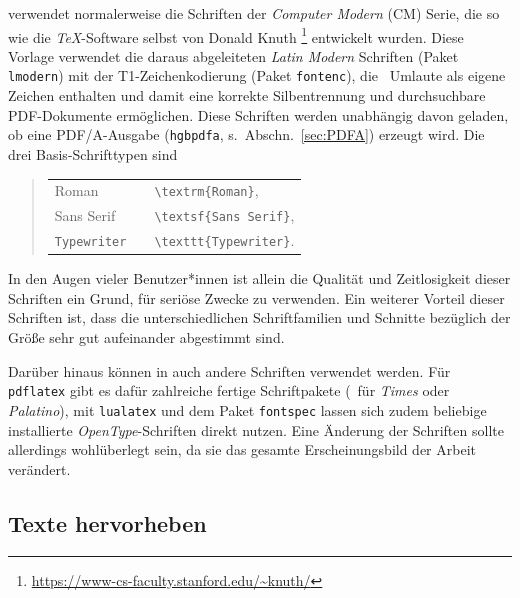 \latex verwendet normalerweise die Schriften der \emph{Computer Modern} (CM)
Serie, die so wie die \emph{TeX}-Software selbst von Donald Knuth%
\footnote{\url{https://www-cs-faculty.stanford.edu/~knuth/}}
entwickelt wurden. Diese Vorlage verwendet die daraus abgeleiteten
\emph{Latin Modern} Schriften (Paket \texttt{lmodern}) mit der
T1-Zeichenkodierung (Paket \texttt{fontenc}), die \ua\ Umlaute als eigene
Zeichen enthalten und damit eine korrekte Silbentrennung und durchsuchbare
PDF-Dokumente ermöglichen. Diese Schriften werden unabhängig davon geladen, ob
eine PDF/A-Ausgabe (\texttt{hgbpdfa}, s.\ Abschn.~\ref{sec:PDFA}) erzeugt wird.
Die drei Basis-Schrifttypen sind
%
\begin{quote}
    \begin{tabular}{lcl}
        \textrm{Roman}      & & \verb!\textrm{Roman}!,      \\
        \textsf{Sans Serif} & & \verb!\textsf{Sans Serif}!, \\
        \texttt{Typewriter} & & \verb!\texttt{Typewriter}!.
    \end{tabular}
\end{quote}
%
\noindent In den Augen vieler Benutzer*innen ist allein die Qualität und
Zeitlosigkeit dieser Schriften ein Grund, \latex für seriöse Zwecke zu
verwenden. Ein weiterer Vorteil dieser Schriften ist, dass die
unterschiedlichen Schriftfamilien und Schnitte bezüglich der Größe sehr gut
aufeinander abgestimmt sind.

Darüber hinaus können in \latex auch andere Schriften verwendet werden. Für
\texttt{pdflatex} gibt es dafür zahlreiche fertige Schriftpakete (\zB\ für
\emph{Times} oder \emph{Palatino}), mit \texttt{lualatex} und dem Paket
\texttt{fontspec} lassen sich zudem beliebige installierte
\emph{OpenType}-Schriften direkt nutzen. Eine Änderung der Schriften sollte
allerdings wohlüberlegt sein, da sie das gesamte Erscheinungsbild der Arbeit
verändert.

\subsection{Texte hervorheben}

